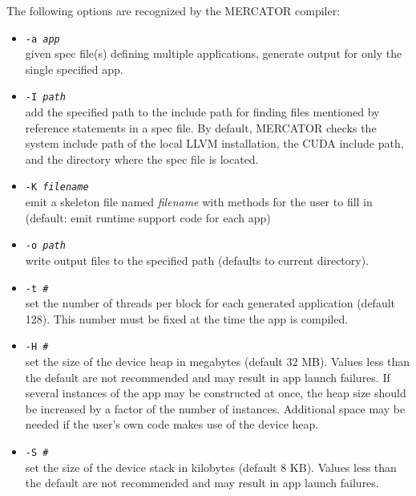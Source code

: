 \documentclass[11pt]{article}
\begin{document}
The following options are recognized by the MERCATOR compiler:
\begin{itemize}

\item \texttt{-a \textit{app}} \\
   given spec file(s) defining multiple applications, generate output
   for only the single specified app.

\item \texttt{-I \textit{path}} \\
   add the specified path to the include path for finding files
   mentioned by reference statements in a spec file.  By default,
   MERCATOR checks the system include path of the local LLVM
   installation, the CUDA include path, and the directory where the
   spec file is located.

\item \texttt{-K \textit{filename}} \\ 
  emit a skeleton file named \textit{filename} with methods for
  the user to fill in (default: emit runtime support code for each app)

\item \texttt{-o \textit{path}} \\
   write output files to the specified path (defaults to current directory).


\item \texttt{-t \textit{\#}} \\
  set the number of threads per block for each generated application
  (default 128).  This number must be fixed at the time the app is
  compiled.
  
\item \texttt{-H \textit{\#}} \\ 
  set the size of the device heap in megabytes (default 32 MB).
  Values less than the default are not recommended and may result in
  app launch failures.  If several instances of the app may be
  constructed at once, the heap size should be increased by a factor
  of the number of instances.  Additional space may be needed if the
  user's own code makes use of the device heap.

\item \texttt{-S \textit{\#}} \\
  set the size of the device stack in kilobytes  (default 8 KB).
  Values less than the default are not recommended and may result
  in app launch failures.


\end{itemize}
\end{document}
